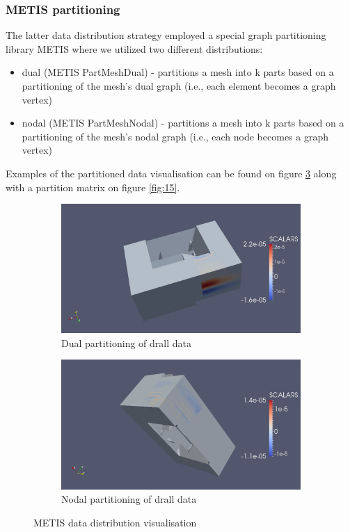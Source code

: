 \documentclass{article}
\begin{document}
\subsubsection{METIS partitioning}
The latter data distribution strategy employed a special graph partitioning library METIS where we utilized two different distributions:
\begin{itemize}
	\item dual (METIS PartMeshDual) - partitions a mesh into k parts based on a partitioning of the mesh’s dual graph (i.e., each element becomes a graph vertex)
	\item nodal (METIS PartMeshNodal) - partitions a mesh into k parts based on a partitioning of the mesh’s nodal graph (i.e., each node becomes a graph vertex)
\end{itemize}
Examples of the partitioned data visualisation can be found on figure \ref{fig:5} along with a partition matrix on figure \ref{fig:15}.
\begin{figure}
	\centering
	\begin{subfigure}[b]{0.45\textwidth}
		\includegraphics[width=\textwidth]{drall-dual.jpg}
		\caption{Dual partitioning of drall data}
		\label{fig:dual}
	\end{subfigure}%
	\begin{subfigure}[b]{0.45\textwidth}
		\includegraphics[width=\textwidth]{drall-nodal.jpg}
		\caption{Nodal partitioning of drall data}
		\label{fig:nodal}
	\end{subfigure}
	\caption{METIS data distribution visualisation}\label{fig:5}
\end{figure}
\end{document}
